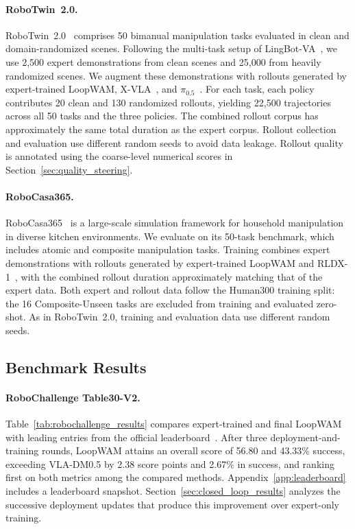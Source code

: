 \paragraph{RoboTwin~2.0.}
RoboTwin~2.0~\citep{chen2025robotwin2} comprises 50 bimanual manipulation tasks evaluated in clean and domain-randomized scenes.
Following the multi-task setup of LingBot-VA~\citep{lingbot-va2026}, we use 2,500 expert demonstrations from clean scenes and 25,000 from heavily randomized scenes.
We augment these demonstrations with rollouts generated by expert-trained LoopWAM, X-VLA~\citep{zheng2025xvla}, and $\pi_{0.5}$~\citep{physicalintelligence2025pi05}.
For each task, each policy contributes 20 clean and 130 randomized rollouts, yielding 22,500 trajectories across all 50 tasks and the three policies.
The combined rollout corpus has approximately the same total duration as the expert corpus.
Rollout collection and evaluation use different random seeds to avoid data leakage.
Rollout quality is annotated using the coarse-level numerical scores in Section~\ref{sec:quality_steering}.





\paragraph{RoboCasa365.}
RoboCasa365~\citep{nasiriany2026robocasa365} is a large-scale simulation framework for household manipulation in diverse kitchen environments.
We evaluate on its 50-task benchmark, which includes atomic and composite manipulation tasks.
Training combines expert demonstrations with rollouts generated by expert-trained LoopWAM and RLDX-1~\citep{kim2026rldx1}, with the combined rollout duration approximately matching that of the expert data.
Both expert and rollout data follow the Human300 training split: the 16 Composite-Unseen tasks are excluded from training and evaluated zero-shot.
As in RoboTwin~2.0, training and evaluation data use different random seeds.


\subsection{Benchmark Results}
\label{sec:benchmark_results}



\paragraph{RoboChallenge Table30-V2.}
Table~\ref{tab:robochallenge_results} compares expert-trained and final LoopWAM with leading entries from the official leaderboard~\citep{robochallenge2026leaderboard}.
After three deployment-and-training rounds, LoopWAM attains an overall score of 56.80 and 43.33\% success, exceeding VLA-DM0.5 by 2.38 score points and 2.67\% in success, and ranking first on both metrics among the compared methods.
Appendix~\ref{app:leaderboard} includes a leaderboard snapshot.
Section~\ref{sec:closed_loop_results} analyzes the successive deployment updates that produce this improvement over expert-only training.

